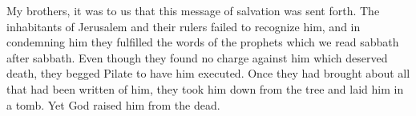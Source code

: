\lettrine[lines=3]{M}{}y brothers, it was to us that this message of salvation was sent forth. The inhabitants of Jerusalem and their rulers failed to recognize him, and in condemning him they fulfilled the words of the prophets which we read sabbath after sabbath. Even though they found no charge against him which deserved death, they begged Pilate to have him executed. Once they had brought about all that had been written of him, they took him down from the tree and laid him in a tomb. Yet God raised him from the dead.
